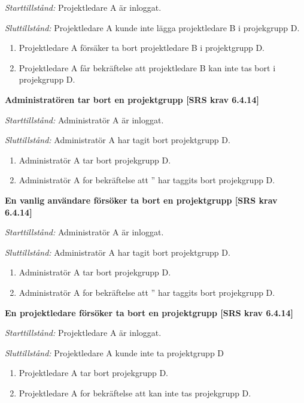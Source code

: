 \documentclass[a4paper]{article}
\begin{document}
\begin{FT}
\emph{Starttillstånd:} Projektledare A är inloggat.

\emph{Sluttillstånd:} Projektledare A kunde inte lägga  projektledare B i projekgrupp D.

\begin{enumerate}
\item Projektledare A försäker ta bort projektledare B i  projektgrupp D.
\item Projektledare A får bekräftelse att projektledare B kan inte tas bort  i projekgrupp D.
\end{enumerate}

\item %
\textbf{Administratören tar bort en projektgrupp [SRS krav 6.4.14]}

\emph{Starttillstånd:} Administratör A är inloggat.

\emph{Sluttillstånd:} Administratör A har tagit bort  projektgrupp D.

\begin{enumerate}
\item Administratör A tar bort  projekgrupp D.
\item Administratör A for bekräftelse att ” har taggits  bort  projekgrupp D.
\end{enumerate}

\item %
\textbf{En vanlig användare försöker ta bort en projektgrupp [SRS krav 6.4.14]}

\emph{Starttillstånd:} Administratör A är inloggat.

\emph{Sluttillstånd:} Administratör A har tagit bort  projektgrupp D.

\begin{enumerate}
\item Administratör A tar bort  projekgrupp D.
\item Administratör A for bekräftelse att ” har taggits  bort  projekgrupp D.
\end{enumerate}

\item %
\textbf{En projektledare försöker ta bort en projektgrupp [SRS krav 6.4.14]}

\emph{Starttillstånd:} Projektledare A är inloggat.

\emph{Sluttillstånd:} Projektledare A kunde inte ta  projektgrupp D

\begin{enumerate}
\item Projektledare A  tar bort  projekgrupp D.
\item Projektledare A for bekräftelse att kan inte tas  projekgrupp D.
\end{enumerate}


\end{FT}
\end{document}
